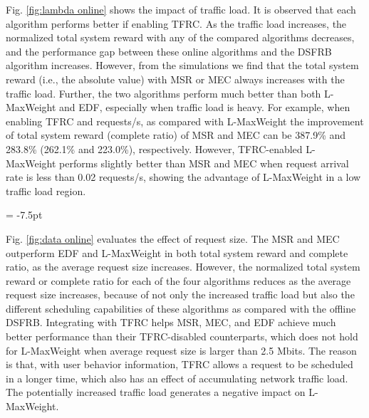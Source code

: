 \documentclass[journal,letterpaper,12pt,oneside,onecolumn,draftclsnofoot]{IEEEtran}
\begin{document}
Fig. \ref{fig:lambda online} shows the impact of traffic load. It is observed that each algorithm performs better if enabling TFRC. As the traffic load increases, the normalized total system reward with any of the compared algorithms decreases, and the performance gap between these online algorithms and the DSFRB algorithm increases. However, from the simulations we find that the total system reward (i.e., the absolute value) with MSR or MEC always increases with the traffic load.
Further, the two algorithms perform much better than both L-MaxWeight and EDF, especially when traffic load is heavy. For example, when enabling TFRC and  requests/s, as compared with L-MaxWeight the improvement of total system reward (complete ratio) of MSR and MEC can be 387.9\% and 283.8\% (262.1\% and 223.0\%), respectively.
However, TFRC-enabled L-MaxWeight performs slightly better than MSR and MEC when request arrival rate is less than 0.02 requests/s, showing the advantage of L-MaxWeight in a low traffic load region.



\vspace{-0.35cm}
\begin{figure*}[htp]
\subfigcapskip = -7.5pt
\centering
{}
\vspace{-0.3cm}
\caption{Impact of average request size on total system reward and complete ratio with online scheduling.}
\label{fig:data online}
\vspace{-0.4cm}
\end{figure*}



Fig. \ref{fig:data online} evaluates the effect of request size.
The MSR and MEC outperform EDF and L-MaxWeight in both total system reward and complete ratio, as the average request size increases.
However, the normalized total system reward or complete ratio for each of the four algorithms reduces as the average request size increases, because of not only the increased traffic load but also the different scheduling capabilities of these algorithms as compared with the offline DSFRB.
Integrating with TFRC helps MSR, MEC, and EDF achieve much better performance than their TFRC-disabled counterparts, which does not hold for L-MaxWeight when average request size is larger than 2.5 Mbits.
The reason is that, with user behavior information, TFRC allows a request to be scheduled in a longer time, which also has an effect of accumulating network traffic load. The potentially increased traffic load generates a negative impact on L-MaxWeight.
\end{document}

